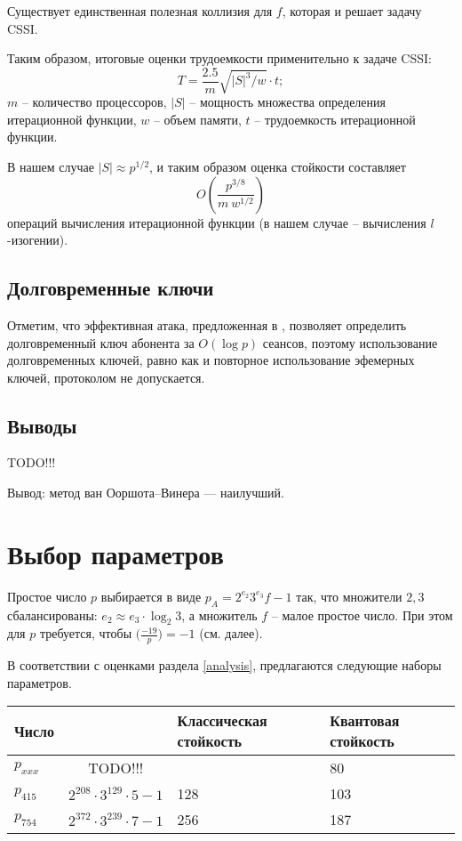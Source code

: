 \documentclass[a4paper,12pt]{article}
\theoremstyle{definition}
\begin{document}
Существует единственная полезная коллизия для $f$, которая и решает задачу CSSI.

Таким образом, итоговые оценки трудоемкости применительно к задаче CSSI:
\begin{equation}
T=\frac{2.5}{m}\sqrt{|S|^3/w}\cdot t;
\end{equation}
$m$ -- количество процессоров, $|S|$ -- мощность множества определения итерационной функции, $w$ -- объем памяти, $t$ -- трудоемкость итерационной функции.

В нашем случае $|S|\approx p^{1/2}$, и таким образом оценка стойкости составляет
\begin{equation} 
O\left(\frac{p^{3/8}}{m\ w^{1/2}}\right)
\end{equation}
операций вычисления итерационной функции (в нашем случае -- вычисления $l$-изогении).

\subsection*{Долговременные ключи}

Отметим, что эффективная атака, предложенная в \cite{sec}, позволяет определить долговременный ключ абонента за $O(\log p)$ сеансов, поэтому использование долговременных ключей,
равно как и повторное использование эфемерных ключей, протоколом не допускается.

\subsection*{Выводы}

TODO!!!

Вывод: метод ван Ооршота--Винера --- наилучший.


\section{Выбор параметров}

Простое число  $p$ выбирается в виде $p_A=2^{e_2}3^{e_3}f-1$ так, что множители $2,3$ сбалансированы:  $e_2\approx e_3 \cdot \log_2 3$, а множитель $f$ -- малое простое число. При этом для $p$ требуется, чтобы
$\big(\frac{-19}{p}\big) = -1$ (см. далее).

В соответствии с оценками раздела \ref{analysis}, предлагаются следующие наборы параметров. %

\begin{center}
 \begin{tabular}{|l|c|p{3cm}|p{3cm}|}
 \hline
 Число & & Классическая стойкость & Квантовая стойкость \\
 \hline
 $p_{xxx}$ & TODO!!!  &   & 80 \\
 \hline
 $p_{415}$ & $2^{208}\cdot 3^{129} \cdot 5 - 1$ & 128 & 103 \\
 \hline 
 $p_{754}$ & $2^{372} \cdot 3^{239} \cdot 7 - 1$ & 256 & 187\\
 \hline
 \end{tabular}

\end{center}
\end{document}
